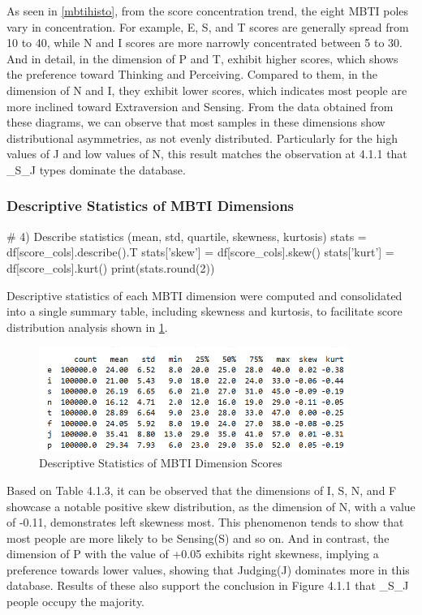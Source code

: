 \documentclass[12pt]{article}
\numberwithin{figure}{section}  %
\begin{document}
	As seen in \cref{mbtihisto}, from the score concentration trend, the eight
	MBTI poles vary in concentration. For example, E, S, and T scores are
	generally spread from 10 to 40, while N and I scores are more narrowly
	concentrated between 5 to 30. And in detail, in the dimension of P and T,
	exhibit higher scores, which shows the preference toward Thinking and
	Perceiving. Compared to them, in the dimension of N and I, they exhibit
	lower scores, which indicates most people are more inclined toward
	Extraversion and Sensing.
	From the data obtained from these diagrams, we can observe that most samples
	in these dimensions show distributional asymmetries, as not evenly
	distributed. Particularly for the high values of J and low values of N, this
	result matches the observation at 4.1.1 that \_S\_J types dominate the %
	database.
	
\subsubsection{Descriptive Statistics of MBTI Dimensions}
	\begin{python}
# 4) Describe statistics (mean, std, quartile, skewness, kurtosis)
stats = df[score_cols].describe().T
stats['skew']  = df[score_cols].skew()
stats['kurt']  = df[score_cols].kurt()
print(stats.round(2))
	\end{python}
	

	
	Descriptive statistics of each MBTI dimension were computed and consolidated
	into a single summary table, including skewness and kurtosis, to facilitate
	score distribution analysis shown in \cref{descstatmbti}.
	
	\begin{figure}[H]
		\centering
		\includegraphics[width=0.9\textwidth]{Q1EDA6} 
		\caption{Descriptive Statistics of MBTI Dimension Scores}	
		\label{descstatmbti}	
	\end{figure}
	
	Based on Table 4.1.3, it can be observed that the dimensions of I, S, N, and %
	F showcase a notable positive skew distribution, as the dimension of N, with
	a value of -0.11, demonstrates left skewness most. This phenomenon tends to
	show that most people are more likely to be Sensing(S) and so on. And in
	contrast, the dimension of P with the value of +0.05 exhibits right
	skewness, implying a preference towards lower values, showing that
	Judging(J) dominates more in this database. Results of these also support
	the conclusion in Figure 4.1.1 that \_S\_J people occupy the majority. %
	
\end{document}
